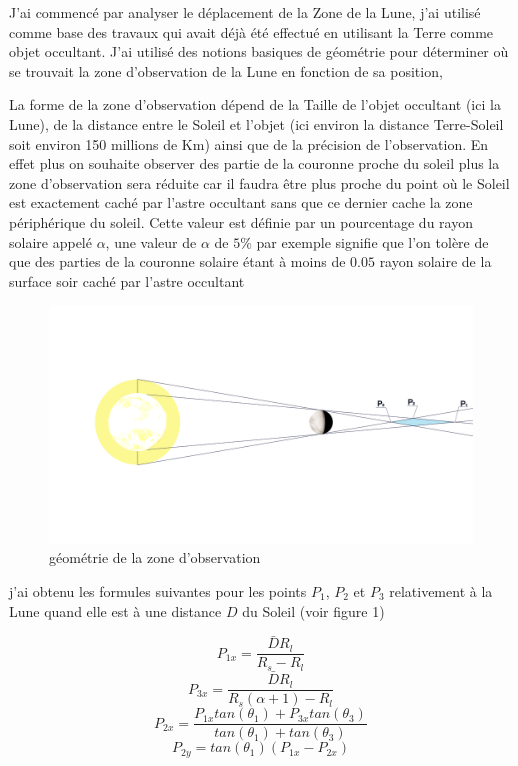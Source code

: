 \documentclass[12pt]{article} %
\begin{document}
		J'ai commencé par analyser le déplacement de la \gls{Zone} de la Lune, j'ai utilisé comme base des travaux qui avait déjà été effectué en utilisant la Terre comme objet occultant. J'ai utilisé des notions basiques de géométrie pour déterminer où se trouvait la zone d'observation de la Lune en fonction de sa position,
		
		La forme de la zone d'observation dépend de la Taille de l'objet occultant (ici la Lune), de la distance entre le Soleil et l'objet (ici environ la distance Terre-Soleil soit environ 150 millions de Km) ainsi que de la précision de l'observation. En effet plus on souhaite observer des partie de la couronne proche du soleil plus la zone d'observation sera réduite car il faudra être plus proche du point où le Soleil est exactement caché par l'astre occultant sans que ce dernier cache la zone périphérique du soleil. Cette valeur est définie par un pourcentage du rayon solaire appelé $\alpha$, une valeur de $\alpha$ de $5\%$ par exemple signifie que l'on tolère de que des parties de la couronne solaire étant à moins de $0.05$ rayon solaire de la surface soir caché par l'astre occultant
		
		\begin{figure}[H]
			\includegraphics[width=1\textwidth]{images/moon_schem.png}
			\caption{géométrie de la zone d'observation}
		\end{figure}
		
		j'ai obtenu les formules suivantes pour les points $P_1$, $P_2$ et $P_3$ relativement à la Lune quand elle  est à une distance $D$ du Soleil (voir figure 1)
		
		$$	
		P_{1x}=\frac{\bar{D}R_l}{R_s-R_l}
		$$ 
		$$	
		P_{3x}=\frac{\bar{D}R_l}{R_s(\alpha+1)-R_l}
		$$
		$$
		P_{2x}=\frac{P_{1x}tan(\theta_1) + P_{3x}tan(\theta_3)}{tan(\theta_1) + tan(\theta_3)}
		$$
		$$
		P_{2y}=tan(\theta_1)(P_{1x}-P_{2x})
		$$
		
\end{document}
